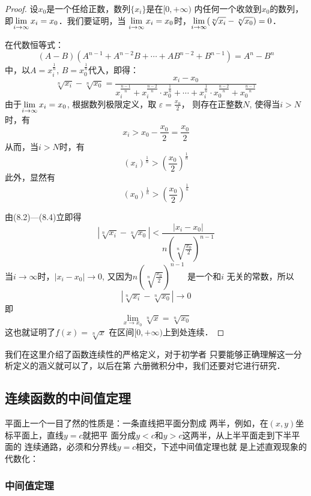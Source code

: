 \begin{proof}
    设$x_0$是一个任给正数，数列$\{x_i\}$是在$[0,+\infty)$
内任何一个收敛到$x_0$的数列，即$\displaystyle\lim_{i\to \infty} x_i=x_0$．我们要证明，当
$\displaystyle\lim_{i\to\infty} x_i=x_0$时，$\displaystyle\lim_{i\to\infty} (\sqrt[n]{x_i}-\sqrt[n]{x_0})=0$．

在代数恒等式：
\[(A-B)\left(A^{n-1}+A^{n-2}B+\cdots +AB^{n-2}+B^{n-1}\right)=A^n-B^n\]
中，以$A=x_i^{\tfrac{1}{n}}$, $B=x_0^{\tfrac{1}{n}}$代入，即得：
\begin{equation}
\sqrt[n]{x_i}-\sqrt[n]{x_0}=\frac{x_i-x_0}{x_i^{\tfrac{n-1}{n}}+x^{\tfrac{n-2}{n}}_i\cdot x_0^{\tfrac{1}{n}}+\cdots +x^{\tfrac{1}{n}}_i\cdot x_0^{\tfrac{n-2}{n}} + x_0^{\tfrac{n-1}{n}}} 
\end{equation}
由于$\displaystyle\lim_{i\to\infty}x_i=x_0$, 根据数列极限定义，取
$\varepsilon=\frac{x_0}{2}$，
则存在正整数$N$, 使得当$i>N$时，有
\[x_i>x_0-\frac{x_0}{2}=\frac{x_0}{2}\]
从而，当$i>N$时，有
\begin{equation}
    (x_i)^{\tfrac{1}{n}}>\left(\frac{x_0}{2}\right)^{\tfrac{1}{n}}
\end{equation}
此外，显然有
\begin{equation}
    (x_0)^{\tfrac{1}{n}}>\left(\frac{x_0}{2}\right)^{\tfrac{1}{n}}
\end{equation}

由(8.2)---(8.4)立即得
\[\left|\sqrt[n]{x_i}-\sqrt[n]{x_0}\right|<\frac{|x_i-x_0|}{n\left(\sqrt[n]{\frac{x_0}{2}}\right)^{n-1}}\]
当$i\to\infty$时，$|x_i-x_0|\to 0$, 又因为$n\left(\sqrt[n]{\frac{x_0}{2}}\right)^{n-1}$
是一个和$i$
无关的常数，所以
\[\left|\sqrt[n]{x_i}-\sqrt[n]{x_0}\right|\to 0\]
即
\[\lim_{x\to x_0} \sqrt[n]{x}=\sqrt[n]{x_0}\]
这也就证明了$f(x)=\sqrt[n]{x}$ 在区间$[0,+\infty)$上到处连续．
\end{proof}

我们在这里介绍了函数连续性的严格定义，对于初学者
只要能够正确理解这一分析定义的涵义就可以了，以后在第
六册微积分中，我们还要对它进行研究．

\subsection{连续函数的中间值定理}
平面上一个一目了然的性质是：一条直线把平面分割成
两半，例如，在$(x,y)$坐标平面上，直线$y=c$就把平
面分成$y<c$和$y>c$这两半，从上半平面走到下半平面的
连续通路，必须和分界线$y=c$相交，下述中间值定理也就
是上述直观现象的代数化：

\subsubsection{中间值定理}


